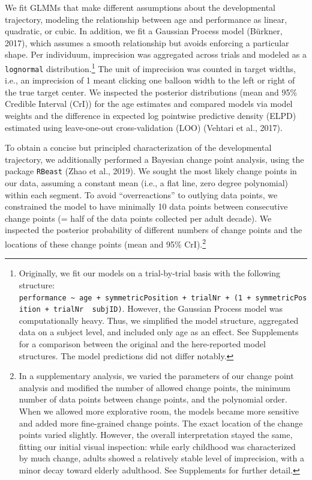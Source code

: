 \documentclass[
  man,mask,floatsintext]{apa7}
\begin{document}
We fit GLMMs that make different assumptions about the developmental trajectory, modeling the relationship between age and performance as linear, quadratic, or cubic. In addition, we fit a Gaussian Process model (Bürkner, 2017), which assumes a smooth relationship but avoids enforcing a particular shape. Per individuum, imprecision was aggregated across trials and modeled as a \texttt{lognormal} distribution.\footnote{Originally, we fit our models on a trial-by-trial basis with the following structure: \texttt{performance\ \textasciitilde{}\ age\ +\ symmetricPosition\ +\ trialNr\ +\ (1\ +\ symmetricPosition\ +\ trialNr\ \textbar{}\ subjID)}. However, the Gaussian Process model was computationally heavy. Thus, we simplified the model structure, aggregated data on a subject level, and included only age as an effect. See Supplements for a comparison between the original and the here-reported model structures. The model predictions did not differ notably.} The unit of imprecision was counted in target widths, i.e., an imprecision of 1 meant clicking one balloon width to the left or right of the true target center. We inspected the posterior distributions (mean and 95\% Credible Interval (CrI)) for the age estimates and compared models via model weights and the difference in expected log pointwise predictive density (ELPD) estimated using leave-one-out cross-validation (LOO) (Vehtari et al., 2017).

To obtain a concise but principled characterization of the developmental trajectory, we additionally performed a Bayesian change point analysis, using the package \texttt{RBeast} (Zhao et al., 2019). We sought the most likely change points in our data, assuming a constant mean (i.e., a flat line, zero degree polynomial) within each segment. To avoid ``overreactions'' to outlying data points, we constrained the model to have minimally 10 data points between consecutive change points (= half of the data points collected per adult decade). We inspected the posterior probability of different numbers of change points and the locations of these change points (mean and 95\% CrI).\footnote{In a supplementary analysis, we varied the parameters of our change point analysis and modified the number of allowed change points, the minimum number of data points between change points, and the polynomial order. When we allowed more explorative room, the models became more sensitive and added more fine-grained change points. The exact location of the change points varied slightly. However, the overall interpretation stayed the same, fitting our initial visual inspection: while early childhood was characterized by much change, adults showed a relatively stable level of imprecision, with a minor decay toward elderly adulthood. See Supplements for further detail.}
\end{document}
